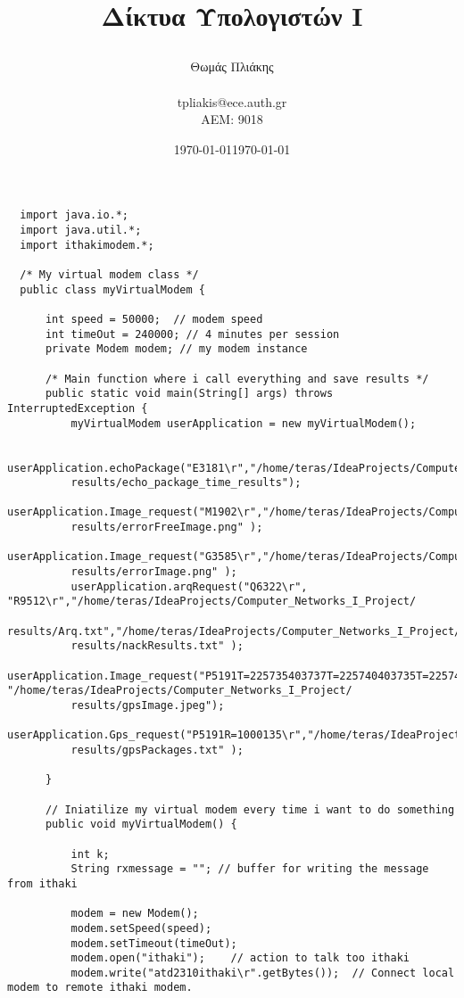 \documentclass[10pt,a4paper]{article}
\title{ 
    \begin{otherlanguage}{greek}
    Δίκτυα Υπολογιστών Ι
    \end{otherlanguage}
    }
\author{
    \begin{otherlanguage}{greek}
    Θωμάς Πλιάκης
    \end{otherlanguage}
    \\ 
    tpliakis@ece.auth.gr 
    \\
    AEM: 9018
    }
\date{\today}
\date{\today}
\begin{document}
\maketitle

\begin{lstlisting}
  import java.io.*;
  import java.util.*;
  import ithakimodem.*;
  
  /* My virtual modem class */
  public class myVirtualModem {
  
      int speed = 50000;  // modem speed
      int timeOut = 240000; // 4 minutes per session
      private Modem modem; // my modem instance
  
      /* Main function where i call everything and save results */
      public static void main(String[] args) throws InterruptedException {
          myVirtualModem userApplication = new myVirtualModem();
  
          userApplication.echoPackage("E3181\r","/home/teras/IdeaProjects/Computer_Networks_I_Project/
          results/echo_package_time_results");
          userApplication.Image_request("M1902\r","/home/teras/IdeaProjects/Computer_Networks_I_Project/
          results/errorFreeImage.png" );
          userApplication.Image_request("G3585\r","/home/teras/IdeaProjects/Computer_Networks_I_Project/
          results/errorImage.png" );
          userApplication.arqRequest("Q6322\r", "R9512\r","/home/teras/IdeaProjects/Computer_Networks_I_Project/
          results/Arq.txt","/home/teras/IdeaProjects/Computer_Networks_I_Project/
          results/nackResults.txt" );
          userApplication.Image_request("P5191T=225735403737T=225740403735T=225742403733T=225735403733\r", "/home/teras/IdeaProjects/Computer_Networks_I_Project/
          results/gpsImage.jpeg");
          userApplication.Gps_request("P5191R=1000135\r","/home/teras/IdeaProjects/Computer_Networks_I_Project/
          results/gpsPackages.txt" );
  
      }
  
      // Iniatilize my virtual modem every time i want to do something
      public void myVirtualModem() {
  
          int k;
          String rxmessage = ""; // buffer for writing the message from ithaki
  
          modem = new Modem();
          modem.setSpeed(speed);
          modem.setTimeout(timeOut);
          modem.open("ithaki");    // action to talk too ithaki
          modem.write("atd2310ithaki\r".getBytes());  // Connect local modem to remote ithaki modem.
  

\end{lstlisting}
\end{document}
